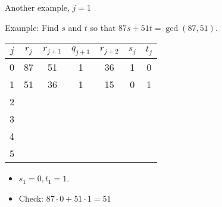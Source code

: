 \documentclass{beamer}
\begin{document}
\begin{frame}{Another example, $j=1$}

Example: Find $s$ and $t$ so that $87s+51t = \gcd(87, 51)$.

\vspace{1em}

\begin{tabular}{|c|c|c|c|c|c|c|}\hline
$j$   &  $r_{j}$    & $r_{j+1}$ & $q_{j+1}$ & $r_{j+2}$ & $s_j$ & $t_j$ \\ \hline\hline
0     &  87         &  51       &    1      &   36      &  1    &   0   \\ \hline
1     &  51         &  36       &    1      &   15      &  0    &   1   \\ \hline
2     &             &           &           &           &       &       \\ \hline
3     &             &           &           &           &       &       \\ \hline
4     &             &           &           &           &       &       \\ \hline
5     &             &           &           &           &       &       \\ \hline
\end{tabular}

\vspace{1em}

\begin{itemize}
  \item $s_1 = 0, t_1 = 1$.
  \item Check: $87\cdot 0 + 51\cdot 1 = 51$
\end{itemize}

\end{frame}
\end{document}
